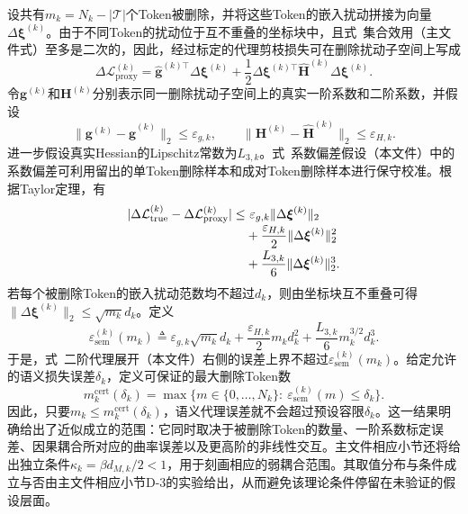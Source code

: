 \documentclass[journal]{IEEEtran}
\begin{document}
设共有$m_k=N_k-|\mathcal T|$个Token被删除，并将这些Token的嵌入扰动拼接为向量$\Delta\bm\xi^{(k)}$。由于不同Token的扰动位于互不重叠的坐标块中，且式~集合效用（主文件式）至多是二次的，因此，经过标定的代理剪枝损失可在删除扰动子空间上写成
\begin{equation}
\Delta\mathcal L_{\mathrm{proxy}}^{(k)}
=\widehat{\bm g}^{(k)\top}\Delta\bm\xi^{(k)}
+\frac12\Delta\bm\xi^{(k)\top}
\widehat{\bm H}^{(k)}\Delta\bm\xi^{(k)}.
\label{eq:proxy_quadratic_form}
\end{equation}
令$\bm g^{(k)}$和$\bm H^{(k)}$分别表示同一删除扰动子空间上的真实一阶系数和二阶系数，并假设
\begin{equation}
\|\bm g^{(k)}-\widehat{\bm g}^{(k)}\|_2\leq\varepsilon_{g,k},
\qquad
\|\bm H^{(k)}-\widehat{\bm H}^{(k)}\|_2\leq\varepsilon_{H,k}.
\label{eq:proxy_coefficient_mismatch}
\end{equation}
进一步假设真实Hessian的Lipschitz常数为$L_{3,k}$。式~系数偏差假设（本文件）中的系数偏差可利用留出的单Token删除样本和成对Token删除样本进行保守校准。根据Taylor定理，有
\begin{align}
|\Delta\mathcal L_{\mathrm{true}}^{(k)}
-\Delta\mathcal L_{\mathrm{proxy}}^{(k)}|
\leq&~\varepsilon_{g,k}\|\Delta\bm\xi^{(k)}\|_2
\notag\\[-0.2em]
&+\frac{\varepsilon_{H,k}}{2}\|\Delta\bm\xi^{(k)}\|_2^2
\notag\\[-0.2em]
&+\frac{L_{3,k}}{6}\|\Delta\bm\xi^{(k)}\|_2^3.
\label{eq:second_order_proxy}
\end{align}
若每个被删除Token的嵌入扰动范数均不超过$d_k$，则由坐标块互不重叠可得$\|\Delta\bm\xi^{(k)}\|_2\leq\sqrt{m_k}d_k$。定义
\begin{equation}
\varepsilon_{\mathrm{sem}}^{(k)}(m_k)
\triangleq \varepsilon_{g,k}\sqrt{m_k}d_k
+\frac{\varepsilon_{H,k}}{2}m_kd_k^2
+\frac{L_{3,k}}{6}m_k^{3/2}d_k^3.
\label{eq:semantic_proxy_bound}
\end{equation}
于是，式~二阶代理展开（本文件）右侧的误差上界不超过$\varepsilon_{\mathrm{sem}}^{(k)}(m_k)$。给定允许的语义损失误差$\delta_k$，定义可保证的最大删除Token数
\begin{equation}
m_{k}^{\mathrm{cert}}(\delta_k)
=\max\{m\in\{0,\ldots,N_k\}:~
\varepsilon_{\mathrm{sem}}^{(k)}(m)\leq\delta_k\}.
\label{eq:certified_deletion_scale}
\end{equation}
因此，只要$m_k\leq m_k^{\mathrm{cert}}(\delta_k)$，语义代理误差就不会超过预设容限$\delta_k$。这一结果明确给出了近似成立的范围：它同时取决于被删除Token的数量、一阶系数标定误差、因果耦合所对应的曲率误差以及更高阶的非线性交互。主文件相应小节还将给出独立条件$\kappa_k=\beta d_{M,k}/2<1$，用于刻画相应的弱耦合范围。其取值分布与条件成立与否由主文件相应小节D-3的实验给出，从而避免该理论条件停留在未验证的假设层面。
\end{document}
